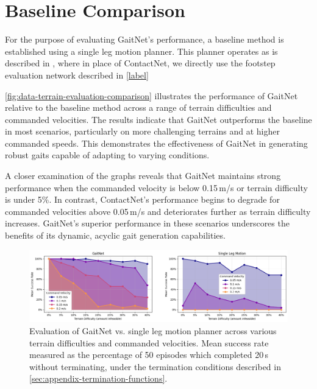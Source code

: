 \section{Baseline Comparison}
\label{sec:baseline-comparison}

For the purpose of evaluating GaitNet's performance, a baseline
method is established using a single leg motion planner. This planner
operates as is described in \cite{bratta_contactnet_2024}, where in
place of ContactNet, we directly use the footstep evaluation  network
described in \autoref{label}

\autoref{fig:data-terrain-evaluation-comparison} illustrates the
performance of GaitNet relative to the baseline method across a range
of terrain difficulties and commanded velocities. The results
indicate that GaitNet outperforms the baseline in most scenarios,
particularly on more challenging terrains and at higher commanded
speeds. This demonstrates the effectiveness of GaitNet in generating
robust gaits capable of adapting to varying conditions.

A closer examination of the graphs reveals that GaitNet maintains
strong performance when the commanded velocity is below 0.15\,m/s or
terrain difficulty is under 5\%. In contrast, ContactNet's
performance begins to degrade for commanded velocities above
0.05\,m/s and deteriorates further as terrain difficulty increases.
GaitNet's superior performance in these scenarios underscores the
benefits of its dynamic, acyclic gait generation capabilities.

\begin{figure}[H]
  \centering
  \includegraphics[width=\textwidth]{images/data/terrain-evaluation-comparison.png}
  \caption{Evaluation of GaitNet vs. single leg motion planner
    across various terrain difficulties and commanded velocities.
    Mean success rate measured as the percentage of 50 episodes
    which completed 20\,s without terminating, under the termination
  conditions described in \autoref{sec:appendix-termination-functions}.}
  \label{fig:data-terrain-evaluation-comparison}
\end{figure}
